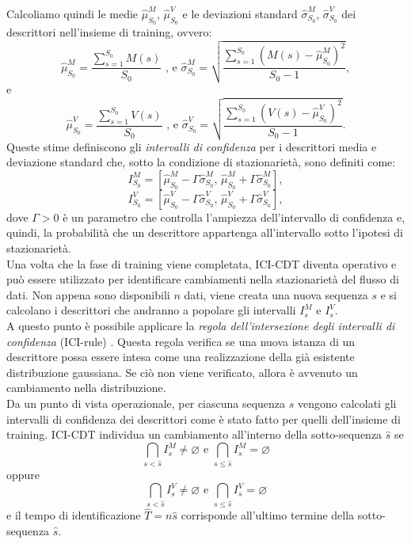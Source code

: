 Calcoliamo quindi le medie $\hat{\mu}^M_{S_0}$, $\hat{\mu}^V_{S_0}$ e le deviazioni standard $\hat{\sigma}^M_{S_0}$, $\hat{\sigma}^V_{S_0}$ dei descrittori nell'insieme di training, ovvero:
\[ \hat{\mu}^M_{S_0}=\frac{\sum\limits_{s=1}^{S_0}M(s)}{S_0} \text{ , e } \hat{\sigma}^M_{S_0}=\sqrt{\frac{\sum\limits_{s=1}^{S_0}(M(s)-\hat{\mu}^M_{S_0})^2}{S_0-1}}, \]
e
\[ \hat{\mu}^V_{S_0}=\frac{\sum\limits_{s=1}^{S_0}V(s)}{S_0} \text{ , e } \hat{\sigma}^V_{S_0}=\sqrt{\frac{\sum\limits_{s=1}^{S_0}(V(s)-\hat{\mu}^V_{S_0})^2}{S_0-1}}. \]
Queste stime definiscono gli \textit{intervalli di confidenza} per i descrittori media e deviazione standard che, sotto la condizione di stazionariet\`a, sono definiti come:
\[I_{S_0}^M= \left[\hat{\mu}^M_{S_0}-\Gamma \hat{\sigma}^M_{S_0} \text{, } \hat{\mu}^M_{S_0}+\Gamma \hat{\sigma}^M_{S_0}\right], \]
\[I_{S_0}^V= \left[\hat{\mu}^V_{S_0}-\Gamma \hat{\sigma}^V_{S_0} \text{, } \hat{\mu}^V_{S_0}+\Gamma \hat{\sigma}^V_{S_0}\right], \]
dove $\Gamma>0$ \`e un parametro che controlla l'ampiezza dell'intervallo di confidenza e, quindi, la probabilit\`a che un descrittore appartenga all'intervallo sotto l'ipotesi di stazionariet\`a. \\
Una volta che la fase di training viene completata, ICI-CDT diventa operativo e pu\`o essere utilizzato per identificare cambiamenti nella stazionariet\`a del flusso di dati. Non appena sono disponibili $n$ dati, viene creata una nuova sequenza $s$ e si calcolano i descrittori che andranno a popolare gli intervalli $I_{s}^{M}$ e $I_{s}^{V}$.\\
A questo punto \`e possibile applicare la \textit{regola dell'intersezione degli intervalli di confidenza} (ICI-rule) \cite{goldenshluger1997spatially}. Questa regola verifica se una nuova istanza di un descrittore possa essere intesa come una realizzazione della gi\`a esistente distribuzione gaussiana. Se ci\`o non viene verificato, allora \`e avvenuto un cambiamento nella distribuzione.\\
Da un punto di vista operazionale, per ciascuna sequenza $s$ vengono calcolati gli intervalli di confidenza dei descrittori come \`e stato fatto per quelli dell'insieme di training. ICI-CDT individua un cambiamento all'interno della sotto-sequenza $\hat{s}$ se
\[\bigcap_{s<\hat{s}}I_s^M \neq \varnothing \text{ e } \bigcap_{s\leq\hat{s}}I_s^M = \varnothing \]
oppure
\[\bigcap_{s<\hat{s}}I_s^V \neq \varnothing \text{ e } \bigcap_{s\leq\hat{s}}I_s^V = \varnothing \]
e il tempo di identificazione $\hat{T}=n\hat{s}$ corrisponde all'ultimo termine della sotto-sequenza $\hat{s}$.\\
